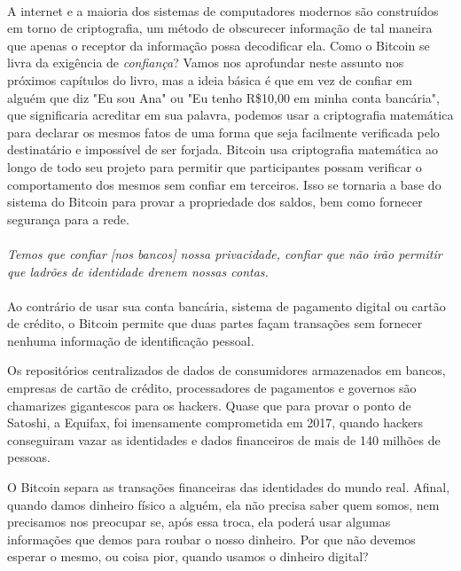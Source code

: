 \paragraph{}
A internet e a maioria dos sistemas de computadores modernos são construídos em torno de criptografia, um método de obscurecer informação de tal maneira que apenas o receptor da informação possa decodificar ela.
Como o Bitcoin se livra da exigência de \textit{confiança}? Vamos nos aprofundar neste assunto nos próximos capítulos do livro, mas a ideia básica é que em vez de confiar em alguém que diz "Eu sou Ana" ou "Eu tenho R\$10,00 em minha conta bancária", que significaria acreditar em sua palavra, podemos usar a criptografia matemática para declarar os mesmos fatos de uma forma que seja facilmente verificada pelo destinatário e impossível de ser forjada.
Bitcoin usa criptografia matemática ao longo de todo seu projeto para permitir que participantes possam verificar o comportamento dos mesmos sem confiar em terceiros.
Isso se tornaria a base do sistema do Bitcoin para provar a propriedade dos saldos, bem como fornecer segurança para a rede.
\paragraph{}
\textit{Temos que confiar [nos bancos] nossa privacidade, confiar que não irão permitir que ladrões de identidade drenem nossas contas.}
\paragraph{}
Ao contrário de usar sua conta bancária, sistema de pagamento digital ou cartão de crédito, o Bitcoin permite que duas partes façam transações sem fornecer nenhuma informação de identificação pessoal.

Os repositórios centralizados de dados de consumidores armazenados em bancos, empresas de cartão de crédito, processadores de pagamentos e governos são chamarizes gigantescos para os hackers. Quase que para provar o ponto de Satoshi, a Equifax, foi imensamente comprometida em 2017, quando hackers conseguiram vazar as identidades e dados financeiros de mais de 140 milhões de pessoas.

O Bitcoin separa as transações financeiras das identidades do mundo real. Afinal, quando damos dinheiro físico a alguém, ela não precisa saber quem somos, nem precisamos nos preocupar se, após essa troca, ela poderá usar algumas informações que demos para roubar o nosso dinheiro. Por que não devemos esperar o mesmo, ou coisa pior, quando usamos o dinheiro digital?

